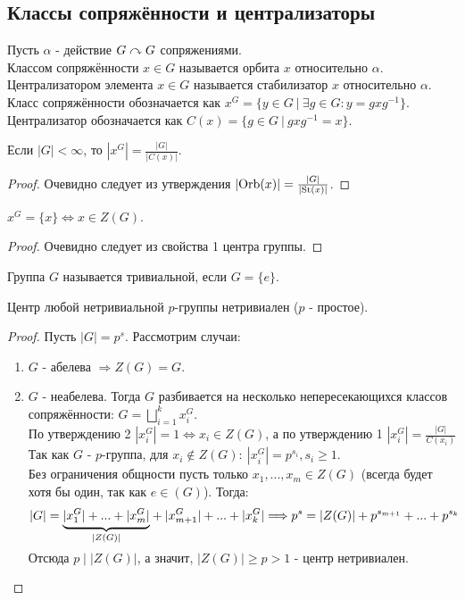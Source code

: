 \subsection{Классы сопряжённости и централизаторы}
\begin{definition}
    Пусть $\alpha$ - действие $G \curvearrowright G$ сопряжениями.\\
    Классом сопряжённости $x \in G$ называется орбита $x$ относительно $\alpha$.\\
    Централизатором элемента $x \in G$ называется стабилизатор $x$ относительно $\alpha$.\\
    Класс сопряжённости обозначается как $x^G = \{y \in G \ | \ \exists g \in G: y = gxg^{-1}\}$.
    Централизатор обозначается как $C(x) = \{g \in G \ |\ gxg^{-1} = x\}$.
\end{definition}
\begin{subtheoremnum}
    Если $|G| < \infty$, то $|x^{G}| = \frac{|G|}{|C(x)|}$.
\end{subtheoremnum}
\begin{proof}
    Очевидно следует из утверждения $|\textup{Orb}(x)| = \frac{|G|}{|\textup{St}(x)|}$.
\end{proof}
\begin{subtheoremnum}
    $x^G = \{x\} \Longleftrightarrow x \in Z(G)$.
\end{subtheoremnum}
\begin{proof}
    Очевидно следует из свойства 1 центра группы.
\end{proof}
\begin{definition}
    Группа $G$ называется тривиальной, если $G = \{e\}$.
\end{definition}
\begin{theorem}
    Центр любой нетривиальной $p$-группы нетривиален ($p$ - простое).
\end{theorem}
\begin{proof}
    Пусть $|G| = p^s$. Рассмотрим случаи:
    \begin{enumerate}
        \item $G$ - абелева $\Longrightarrow Z(G) = G$.
        \item $G$ - неабелева. Тогда $G$ разбивается на несколько непересекающихся классов сопряжённости: $G = \bigsqcup \limits_{i=1}^k x_i^G$.\\
        По утверждению 2 $|x_i^G| = 1 \Longleftrightarrow x_i \in Z(G)$, а по утверждению 1 $|x_i^G| = \frac{|G|}{C(x_i)}$\\
        Так как $G$ - $p$-группа, для $x_i \notin Z(G): \  |x_i^G| = p^{s_i}, s_i \geqslant 1$.\\
        Без ограничения общности пусть только $x_1,...,x_m \in Z(G)$ (всегда будет хотя бы один, так как $e \in (G)$). Тогда: 
        \[|G| = \undermat{|Z(G)|}{|x_1^G| + ... + |x_m^G|} + |x_{m+1}^G| + ... + |x_k^G| \Longrightarrow p^s = |Z(G)| + p^{s_{m+1}} + ... + p^{s_k}\]
        \\
        Отсюда $p \mid |Z(G)|$, а значит, $|Z(G)| \geqslant p > 1$ - центр нетривиален.
    \end{enumerate}
\end{proof}
